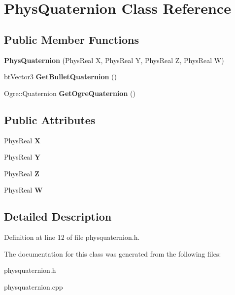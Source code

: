 \hypertarget{classPhysQuaternion}{
\section{PhysQuaternion Class Reference}
\label{d5/d19/classPhysQuaternion}
}
\subsection*{Public Member Functions}
\begin{DoxyCompactItemize}
\item 
\hypertarget{classPhysQuaternion_aa0cbd53e7a9e624a3f0f22aa94618e17}{
{\bfseries PhysQuaternion} (PhysReal X, PhysReal Y, PhysReal Z, PhysReal W)}
\label{d5/d19/classPhysQuaternion_aa0cbd53e7a9e624a3f0f22aa94618e17}

\item 
\hypertarget{classPhysQuaternion_ac19cebf7408b5e72ea3d6398d47da762}{
btVector3 {\bfseries GetBulletQuaternion} ()}
\label{d5/d19/classPhysQuaternion_ac19cebf7408b5e72ea3d6398d47da762}

\item 
\hypertarget{classPhysQuaternion_a30adc9ec3604da6ac9df49dc25b6fd31}{
Ogre::Quaternion {\bfseries GetOgreQuaternion} ()}
\label{d5/d19/classPhysQuaternion_a30adc9ec3604da6ac9df49dc25b6fd31}

\end{DoxyCompactItemize}
\subsection*{Public Attributes}
\begin{DoxyCompactItemize}
\item 
\hypertarget{classPhysQuaternion_ac6ef4975979103a0285379e166dafc9c}{
PhysReal {\bfseries X}}
\label{d5/d19/classPhysQuaternion_ac6ef4975979103a0285379e166dafc9c}

\item 
\hypertarget{classPhysQuaternion_a2b07bc54cfd68f82588cb869f8ef4428}{
PhysReal {\bfseries Y}}
\label{d5/d19/classPhysQuaternion_a2b07bc54cfd68f82588cb869f8ef4428}

\item 
\hypertarget{classPhysQuaternion_a991d092617466f15ab7c297059668cf2}{
PhysReal {\bfseries Z}}
\label{d5/d19/classPhysQuaternion_a991d092617466f15ab7c297059668cf2}

\item 
\hypertarget{classPhysQuaternion_a5569a775ccde5755ffa4a12a0a31c555}{
PhysReal {\bfseries W}}
\label{d5/d19/classPhysQuaternion_a5569a775ccde5755ffa4a12a0a31c555}

\end{DoxyCompactItemize}


\subsection{Detailed Description}


Definition at line 12 of file physquaternion.h.

The documentation for this class was generated from the following files:\begin{DoxyCompactItemize}
\item 
physquaternion.h\item 
physquaternion.cpp\end{DoxyCompactItemize}
